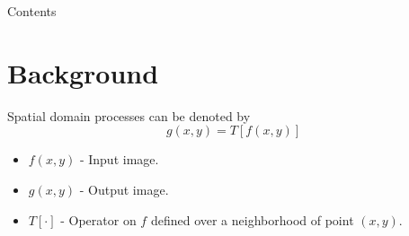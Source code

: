 


\subtitle[Intensity Transformations]{Digital Image Processing} %





\begin{frame}
\titlepage %
\end{frame}


\begin{frame}{Contents}
\setcounter{tocdepth}{1}
\tableofcontents
\end{frame}




\section{Background}

%


\begin{frame}
Spatial domain processes can be denoted by
\begin{equation}
g(x,y) = T\left [f(x,y)\right ]
\end{equation}
\begin{itemize}
\item $f(x,y)$ - Input image.
\item $g(x,y)$ - Output image.
\item $T[\cdot]$ - Operator on $f$ defined over a neighborhood of point $(x,y)$.
\end{itemize}
\end{frame}

